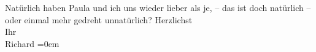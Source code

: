 \begin{ledgroupsized}[t]{13cm}
           \pstart
           Natürlich haben Paula und ich uns wieder
               lieber als {\pb}je, – das ist doch
               natürlich – oder  einmal mehr gedreht
               unnatürlich?\pend
           \pstart
           Herzlichst{\\[\baselineskip]}Ihr{\\[\baselineskip]}\spacefill\mbox{Richard}\pend
           \leftskip=0em{}\endnumbering{}\end{ledgroupsized}  \newcommand{\dateiname}{L00591}\newcommand{\titel}{Richard Beer-Hofmann an Arthur Schnitzler, 15. 9. 1896}\newcommand{\editorInnen}{Martin Anton Müller und Gerd-Hermann Susen}
      